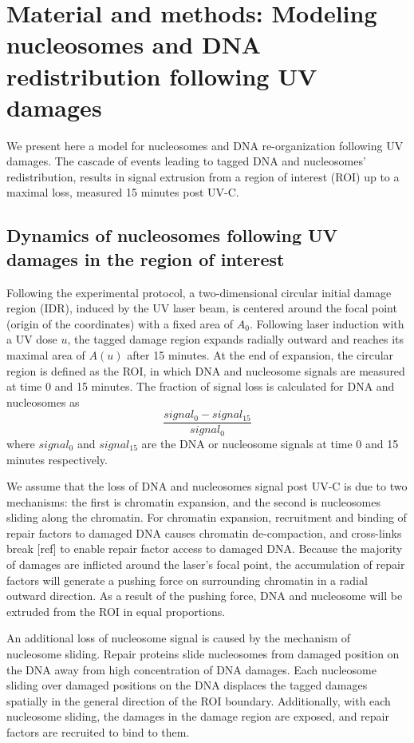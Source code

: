 \documentclass[12pt]{article}
\begin{document}
 \section{Material and methods: Modeling nucleosomes and DNA redistribution following UV damages} 
	
	We present here a model for nucleosomes and DNA re-organization following
	UV damages. The cascade of events leading to tagged DNA and nucleosomes'
	redistribution, results in signal extrusion from a region of interest (ROI) up
	to a maximal loss, measured 15 minutes post UV-C.
	
	\subsection{Dynamics of nucleosomes following UV damages in the region of interest}
	
	Following the experimental protocol, a two-dimensional circular initial damage region (IDR), induced by the UV laser beam, is centered around the focal point (origin of the coordinates) with a fixed area of $A_0$. Following
	laser induction with a UV dose $u$, the tagged damage region expands radially outward and reaches its maximal area of $A(u)$ after 15 minutes. At the end of expansion, the circular region is defined
	as the ROI, in which DNA and nucleosome signals are measured at
	time 0 and 15 minutes. The fraction of signal loss is calculated for DNA and nucleosomes as
	\begin{equation}
	\frac{signal_0-signal_{15}}{signal_0}
	\end{equation}	
	where $signal_0$ and $signal_{15}$ are the DNA or nucleosome signals at time 0 and 15 minutes respectively. 
	
	We assume that the loss of DNA and nucleosomes signal post UV-C is due
	to two mechanisms: the first is chromatin expansion, and the second is nucleosomes sliding along the chromatin. For chromatin expansion, recruitment and
	binding of repair factors to damaged DNA causes chromatin de-compaction, and cross-links break [ref] to enable repair factor access to damaged DNA. Because the majority of damages are inflicted around the laser's focal point, the accumulation of repair factors will generate a pushing force on surrounding chromatin in a radial outward direction. As a result of the pushing force, DNA and nucleosome will be extruded from the ROI in equal proportions. 
	
	An additional loss of nucleosome signal is caused by the mechanism of nucleosome sliding. Repair proteins slide nucleosomes from damaged position on the DNA away from high concentration of DNA damages. Each nucleosome sliding over damaged positions on the DNA displaces the tagged damages
    spatially in the general direction of the ROI boundary. Additionally, with each nucleosome sliding, the damages in the damage region are exposed, and repair factors are recruited to bind to them.   
\end{document}
